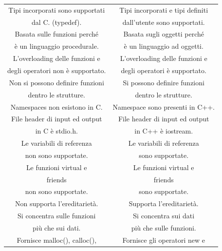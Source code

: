 \begin{longtable}{|c|c|}
	\hline
	\textsf{\small Tipi incorporati sono supportati} & \textsf{\small Tipi incorporati e tipi definiti} \\
	\textsf{\small dal C. (typedef).} & \textsf{\small dall'utente sono supportati.} \\
	\hline
	\textsf{\small Basata sulle funzioni perché} & \textsf{\small Basata sugli oggetti perché} \\
	\textsf{\small è un linguaggio procedurale.} & \textsf{\small è un linguaggio ad oggetti.} \\
	\hline
	\textsf{\small L'overloading delle funzioni e} & \textsf{\small L'overloading delle funzioni e} \\
	\textsf{\small degli operatori non è supportato.} & \textsf{\small degli operatori è supportato.} \\
	\hline
	\textsf{\small Non si possono definire funzioni} & \textsf{\small Si possono definire funzioni} \\
	\textsf{\small dentro le strutture.} & \textsf{\small dentro le strutture.} \\
	\hline
	\textsf{\small Namespaces non esistono in C.} & \textsf{\small Namespace sono presenti in C++.} \\
	\textsf{\small File header di input ed output} & \textsf{\small File header di input ed output} \\
	\textsf{\small in C è stdio.h.} & \textsf{\small in C++ è iostream.} \\
	\hline
	\textsf{\small Le variabili di referenza } & \textsf{\small Le variabili di referenza } \\
	\textsf{\small non sono supportate.} & \textsf{\small sono supportate.} \\
	\hline
	\textsf{\small Le funzioni virtual e} & \textsf{\small Le funzioni virtual e} \\
	\textsf{\small friends } & \textsf{\small friends } \\
	\textsf{\small non sono supportate.} & \textsf{\small sono supportate.} \\
	\hline
	\textsf{\small Non supporta l'ereditarietà.} & \textsf{\small Supporta l'ereditarietà.} \\
	\hline
	\textsf{\small Si concentra sulle funzioni} & \textsf{\small Si concentra sui dati} \\
	\textsf{\small più che sui dati.} & \textsf{\small più che sulle funzioni.} \\
	\hline
	\textsf{\small Fornisce malloc(), calloc(),} & \textsf{\small Fornisce gli operatori new e } \\

\end{longtable}
